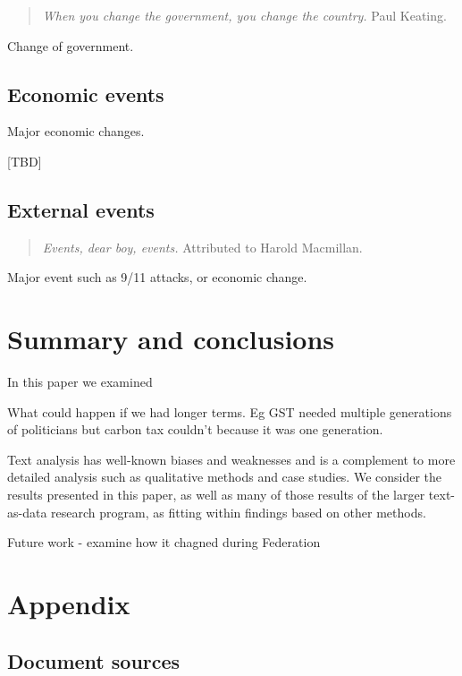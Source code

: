 \documentclass[12pt,]{article}
\theoremstyle{definition}
\theoremstyle{definition}
\theoremstyle{definition}
\theoremstyle{remark}
\begin{document}
\begin{quote}
\emph{When you change the government, you change the country.} Paul
Keating.
\end{quote}

Change of government.

\subsection{Economic events}\label{economic-events}

Major economic changes.

{[}TBD{]}

\subsection{External events}\label{external-events}

\begin{quote}
\emph{Events, dear boy, events.} Attributed to Harold Macmillan.
\end{quote}

Major event such as 9/11 attacks, or economic change.

\section{Summary and conclusions}\label{summary-and-conclusions}

In this paper we examined

What could happen if we had longer terms. Eg GST needed multiple
generations of politicians but carbon tax couldn't because it was one
generation.

Text analysis has well-known biases and weaknesses and is a complement
to more detailed analysis such as qualitative methods and case studies.
We consider the results presented in this paper, as well as many of
those results of the larger text-as-data research program, as fitting
within findings based on other methods.

Future work - examine how it chagned during Federation

\newpage

\section{Appendix}\label{appendix}

\subsection{Document sources}\label{document-sources}
\end{document}
